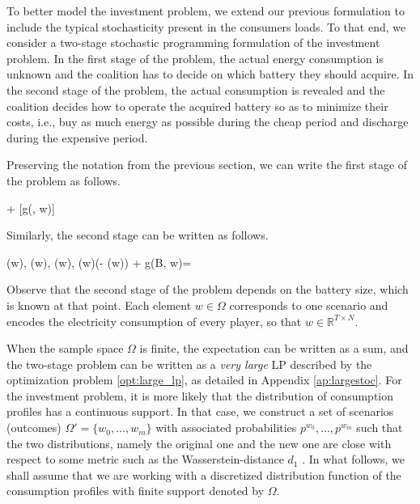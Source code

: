 To better model the investment problem, we extend our previous formulation to include the typical stochasticity present in the consumers loads. To that end, we consider a two-stage stochastic programming formulation of the investment problem. 
In the first stage of the problem, the actual energy consumption is unknown and the coalition has to decide on which battery they should acquire. 
In the second stage of the problem, the actual consumption is revealed and the coalition decides how to operate the acquired battery so as to minimize their costs, i.e., buy as much energy as possible during the cheap period and discharge during the expensive period.

Preserving the notation from the previous section, we can write the first stage of the problem as follows.

\begin{mini!}[4]
{\bat}{  \bat + [g(\bat, w)]}{}{}
\label{eq:stoc_first_stage}
\end{mini!}

Similarly, the second stage can be written as follows.

\begin{mini!}[3]
{\Ep(w), \Ene(w), \ep(w), \ene(w)}{\pricelow(\bat - \Ene(w)) + }{}{g(B, w)=}\label{opt:second_stage}
\end{mini!}

Observe that the second stage of the problem depends on the battery size, which is known at that point.
Each element $w \in \Omega$ corresponds to one scenario and encodes the electricity consumption of every player, so that $w \in \mathbb{R}^{T \times N}$.


When the sample space $\Omega$ is finite, the expectation can be written as a sum, and the two-stage problem can be written as a \textit{very large} LP described by the optimization problem \eqref{opt:large_lp}, as detailed in Appendix \ref{ap:largestoc}.
For the investment problem, it is more likely that the distribution of consumption profiles has a continuous support. In that case, we construct a set of scenarios (outcomes) $\Omega' = \{w_0, \dots, w_m\}$ with associated probabilities $p^{w_0}, \dots, p^{w_m}$ such that the two distributions, namely the original one and the new one are close with respect to some metric such as the Wasserstein-distance $d_1$ \cite{pflug2001scenario}.
In what follows, we shall assume that we are working with a discretized distribution function of the consumption profiles with finite support denoted by $\Omega$.



